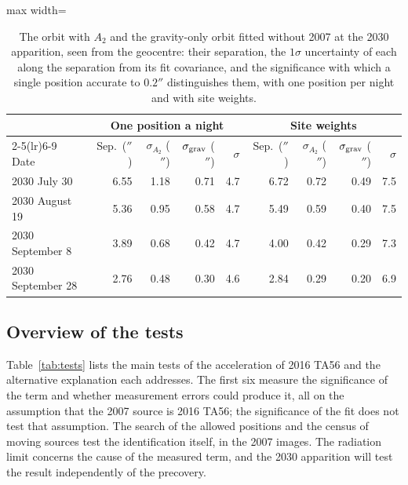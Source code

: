 \documentclass[3p,11pt]{elsarticle}
\begin{document}
\begin{table}[t]
\centering\small
\caption{The orbit with $A_2$ and the gravity-only orbit fitted without 2007 at the 2030
apparition, seen from the geocentre: their separation, the $1\sigma$ uncertainty of each
along the separation from its fit covariance, and the significance with which a single
position accurate to $0.2''$ distinguishes them, with one position per night and with
site weights.}
\label{tab:pred}
\begin{adjustbox}{max width=\textwidth}
\begin{tabular}{lrrrrrrrr}
\toprule
 & \multicolumn{4}{c}{One position a night} & \multicolumn{4}{c}{Site weights} \\
\cmidrule(lr){2-5}\cmidrule(lr){6-9}
Date & Sep.\ ($''$) & $\sigma_{A_2}$ ($''$) & $\sigma_{\rm grav}$ ($''$) & $\sigma$ & Sep.\ ($''$) & $\sigma_{A_2}$ ($''$) & $\sigma_{\rm grav}$ ($''$) & $\sigma$ \\
\midrule
2030 July 30 & 6.55 & 1.18 & 0.71 & 4.7 & 6.72 & 0.72 & 0.49 & 7.5 \\
2030 August 19 & 5.36 & 0.95 & 0.58 & 4.7 & 5.49 & 0.59 & 0.40 & 7.5 \\
2030 September 8 & 3.89 & 0.68 & 0.42 & 4.7 & 4.00 & 0.42 & 0.29 & 7.3 \\
2030 September 28 & 2.76 & 0.48 & 0.30 & 4.6 & 2.84 & 0.29 & 0.20 & 6.9 \\
\bottomrule
\end{tabular}
\end{adjustbox}
\end{table}

\subsection{Overview of the tests}\label{sec:summary}

Table~\ref{tab:tests} lists the main tests of the acceleration of 2016 TA56 and the
alternative explanation each addresses. The first six measure the significance of the term
and whether measurement errors could produce it, all on the assumption that the 2007
source is 2016 TA56; the significance of the fit does not test that assumption. The search
of the allowed positions and the census of moving sources test the identification itself,
in the 2007 images. The radiation limit concerns the cause of the measured term, and the
2030 apparition will test the result independently of the precovery.
\end{document}
